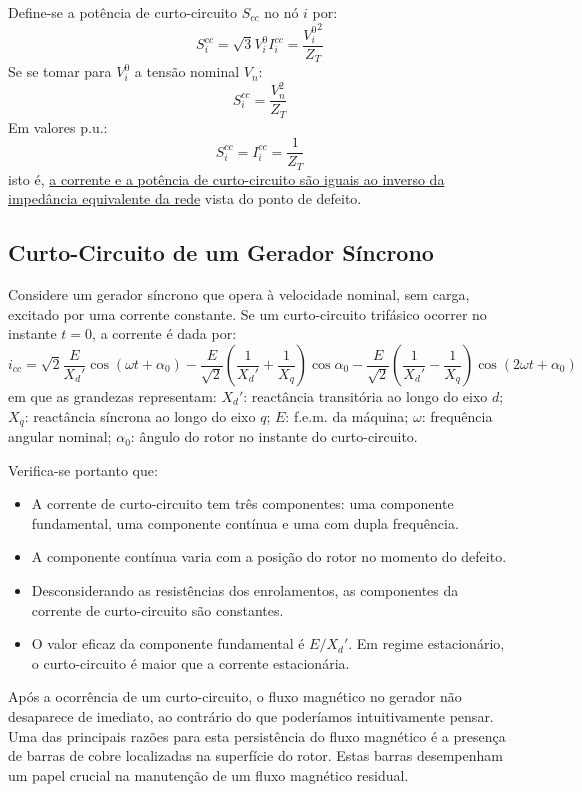 \vspace{1em}
\noindent Define-se a potência de curto-circuito $S_{cc}$ no nó $i$ por:
$$
    S_i^{cc} = \sqrt{3} V_i^0 I_i^{cc} = \frac{{V_i^0}^2}{Z_T}
$$
Se se tomar para $V_i^0$ a tensão nominal $V_n$:
$$
    S_i^{cc} = \frac{V^2_n}{Z_T}
$$
Em valores p.u.:
$$
    \boxed{S_i^{cc} = I_i^{cc} = \frac{1}{Z_T}}
$$
isto é, \underline{a corrente e a potência de curto-circuito são iguais ao inverso da impedância equivalente da rede} vista do ponto de defeito.
\subsection{Curto-Circuito de um Gerador Síncrono}

Considere um gerador síncrono que opera à velocidade nominal, sem carga, excitado por uma corrente constante. Se um curto-circuito trifásico ocorrer no instante $t=0$, a corrente é dada por:
$$
    i_{cc} = \sqrt{2} \frac{E}{X_d'} \cos(\omega t + \alpha_0) - \frac{E}{\sqrt{2}}  \left( \frac{1}{X_d'} + \frac{1}{X_q} \right) \cos \alpha_0 - \frac{E}{\sqrt{2}}  \left( \frac{1}{X_d'} - \frac{1}{X_q} \right) \cos(2\omega t + \alpha_0)
$$
em que as grandezas representam: $X_d'$: reactância transitória ao longo do eixo $d$; $X_q$: reactância síncrona ao longo do eixo $q$; $E$: f.e.m. da máquina; $\omega$: frequência angular nominal; $\alpha_0$: ângulo do rotor no instante do curto-circuito.

\vspace{0.5em}
\noindent Verifica-se portanto que:
\begin{itemize}
    \item A corrente de curto-circuito tem três componentes: uma componente fundamental, uma componente contínua e uma com dupla frequência.
    \item A componente contínua varia com a posição do rotor no momento do defeito.
    \item Desconsiderando as resistências dos enrolamentos, as componentes da corrente de curto-circuito são constantes.
    \item O valor eficaz da componente fundamental é $E/X_d'$. Em regime estacionário, o curto-circuito é maior que a corrente estacionária.
\end{itemize}

\noindent Após a ocorrência de um curto-circuito, o fluxo magnético no gerador não desaparece de imediato, ao contrário do que poderíamos intuitivamente pensar. Uma das principais razões para esta persistência do fluxo magnético é a presença de barras de cobre localizadas na superfície do rotor. Estas barras desempenham um papel crucial na manutenção de um fluxo magnético residual.

